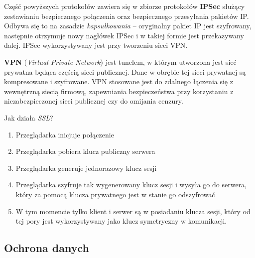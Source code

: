 Część powyższych protokołów zawiera się w zbiorze protokołów \textbf{IPSec} służący zestawianiu bezpiecznego połączenia oraz bezpiecznego przesyłania pakietów IP. Odbywa się to na zasadzie \textit{kapsułkowania} -- oryginalny pakiet IP jest szyfrowany, następnie otrzymuje nowy nagłówek IPSec i w takiej formie jest przekazywany dalej. IPSec wykorzystywany jest przy tworzeniu sieci VPN.

\textbf{VPN} (\textit{Virtual Private Network}) jest tunelem, w którym utworzona jest sieć prywatna będąca częścią sieci publicznej. Dane w obrębie tej sieci prywatnej są kompresowane i szyfrowane. VPN stosowane jest do zdalnego łączenia się z wewnętrzną siecią firmową, zapewniania bezpieczeństwa przy korzystaniu z niezabezpieczonej sieci publicznej czy do omijania cenzury.

Jak działa \textit{SSL}?
\begin{enumerate}
	\item Przeglądarka inicjuje połączenie
	\item Przeglądarka pobiera klucz publiczny serwera
	\item Przeglądarka generuje jednorazowy klucz sesji
	\item Przeglądarka szyfruje tak wygenerowany klucz sesji i wysyła go do serwera, który za pomocą klucza prywatnego jest w stanie go odszyfrować
	\item W tym momencie tylko klient i serwer są w posiadaniu klucza sesji, który od tej pory jest wykorzystywany jako klucz symetryczny w komunikacji.
\end{enumerate}

\subsection{Ochrona danych}

